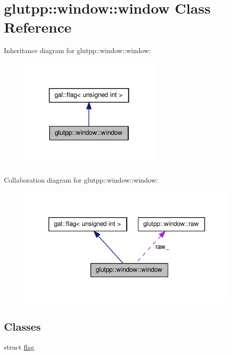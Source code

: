 \hypertarget{classglutpp_1_1window_1_1window}{\section{glutpp\-:\-:window\-:\-:window \-Class \-Reference}
\label{classglutpp_1_1window_1_1window}
}


\-Inheritance diagram for glutpp\-:\-:window\-:\-:window\-:\nopagebreak
\begin{figure}[H]
\begin{center}
\leavevmode
\includegraphics[width=202pt]{classglutpp_1_1window_1_1window__inherit__graph}
\end{center}
\end{figure}


\-Collaboration diagram for glutpp\-:\-:window\-:\-:window\-:\nopagebreak
\begin{figure}[H]
\begin{center}
\leavevmode
\includegraphics[width=324pt]{classglutpp_1_1window_1_1window__coll__graph}
\end{center}
\end{figure}
\subsection*{\-Classes}
\begin{DoxyCompactItemize}
\item 
struct \hyperlink{structglutpp_1_1window_1_1window_1_1flag}{flag}
\end{DoxyCompactItemize}

